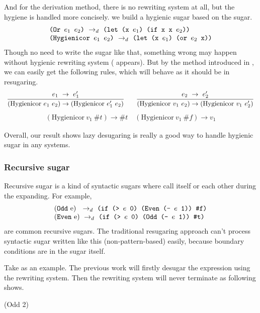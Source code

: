 And for the derivation method, there is no rewriting system at all, but the hygiene is handled more concisely. we build a hygienic sugar  based on the  sugar.
\[
\begin{array}{l}
\texttt{(Or $e_1$ $e_2$)} ~\rightarrow_d~ \texttt{(let (x $e_1$) (if x x $e_2$))}\\
\texttt{(Hygienicor $e_1$ $e_2$)} ~\rightarrow_d~ \texttt{(let (x $e_1$) (or $e_2$ x))}
\end{array}
\]
Though no need to write the sugar like that, something wrong may happen without hygienic rewriting system ( appears). But by the method introduced in , we can easily get the following rules, which will behave as it should be in resugaring.
\[
\begin{array}{c}
\infer {(\mbox{Hygienicor}~e_1~e_2) \rightarrow (\mbox{Hygienicor}~e_1'~e_2)} {e_1~ \rightarrow~e_1'}
\qquad
\infer {(\mbox{Hygienicor}~v_1~e_2) \rightarrow (\mbox{Hygienicor}~v_1~e_2')} {e_2~ \rightarrow~e_2'}
\end{array}\]
\[
\begin{array}{c}
(\mbox{Hygienicor}~v_1~\#t) \rightarrow \#t
\quad
(\mbox{Hygienicor}~v_1~\#f) \rightarrow v_1
\end{array}
\]

Overall, our result shows lazy desugaring is really a good way to handle hygienic sugar in any systems.

\subsubsection{Recursive sugar}
\label{sec:recursiveSugar}

Recursive sugar is a kind of syntactic sugars where call itself or each other during the expanding. For example,
\[
\begin{array}{l}
\drule{(\m{Odd}~$e$)~}{\Code{(if (> $e$ 0) (Even (- $e$ 1)) \false)}}\\
\drule{(\m{Even}~$e$)}{\Code{(if (> $e$ 0) (Odd (- $e$ 1)) \true)}}
\end{array}
\]
are common recursive sugars. The traditional resugaring approach can't process syntactic sugar written like this (non-pattern-based) easily, because boundary conditions are in the sugar itself.

Take  as an example. The previous work will firstly desugar the expression using the rewriting system. Then the rewriting system will never terminate as following shows.
\begin{scriptsize}
\begin{Codes}
   (Odd 2)
\end{Codes}
\end{scriptsize}



